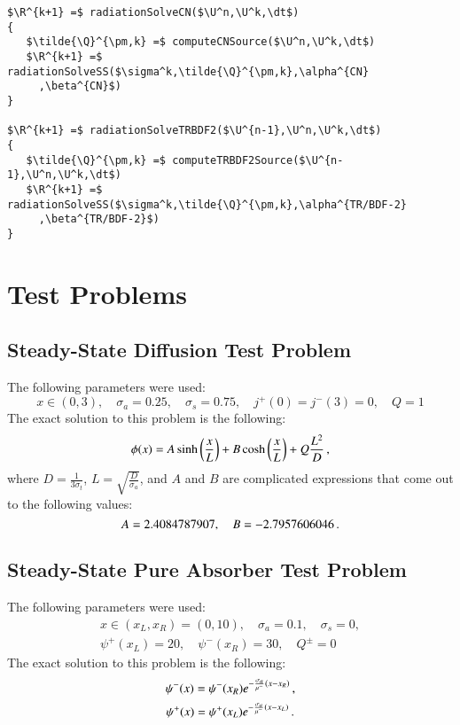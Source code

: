 \documentclass[preprint,12pt]{elsarticle}
\begin{document}
\begin{lstlisting}[mathescape,columns=fullflexible,
   basicstyle=\fontfamily{lmvtt}\selectfont]
$\R^{k+1} =$ radiationSolveCN($\U^n,\U^k,\dt$)
{
   $\tilde{\Q}^{\pm,k} =$ computeCNSource($\U^n,\U^k,\dt$)
   $\R^{k+1} =$ radiationSolveSS($\sigma^k,\tilde{\Q}^{\pm,k},\alpha^{CN}
     ,\beta^{CN}$)
}

$\R^{k+1} =$ radiationSolveTRBDF2($\U^{n-1},\U^n,\U^k,\dt$)
{
   $\tilde{\Q}^{\pm,k} =$ computeTRBDF2Source($\U^{n-1},\U^n,\U^k,\dt$)
   $\R^{k+1} =$ radiationSolveSS($\sigma^k,\tilde{\Q}^{\pm,k},\alpha^{TR/BDF-2}
     ,\beta^{TR/BDF-2}$)
}
\end{lstlisting}

\section{Test Problems}
\subsection{Steady-State Diffusion Test Problem}
The following parameters were used:
\[
   x\in(0,3),
   \quad \sigma_a = 0.25,
   \quad \sigma_s = 0.75,
   \quad j^+(0) = j^-(3) = 0,
   \quad Q = 1
\]
The exact solution to this problem is the following:
\[
   \phi(x) = A\sinh\left( \frac{x}{L} \right) + B\cosh\left( \frac{x}{L} \right) + Q\frac{L^2}{D} \, ,
\]
where $D=\frac{1}{3\sigma_t}$, $L=\sqrt{\frac{D}{\sigma_a}}$, and $A$ and $B$ are
complicated expressions that come out to the following values:
\[
   A=2.4084787907,\quad B=-2.7957606046 \, .
\]

\subsection{Steady-State Pure Absorber Test Problem}
The following parameters were used:
\begin{gather*}
   x\in(x_L,x_R)=(0,10),
   \quad \sigma_a = 0.1,
   \quad \sigma_s = 0,\\
   \psi^+(x_L) = 20,
   \quad \psi^-(x_R) = 30,
   \quad Q^\pm = 0
\end{gather*}
The exact solution to this problem is the following:
\[
   \psi^-(x) = \psi^-(x_R)e^{-\frac{\sigma_a}{\mu^-}\left( x-x_R \right)} \, ,
\]
\[
   \psi^+(x) = \psi^+(x_L)e^{-\frac{\sigma_a}{\mu^-}\left( x-x_L \right)} \, .
\]
\end{document}
